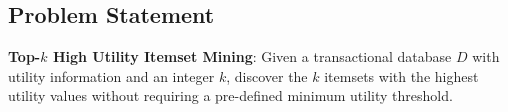 \subsection{Problem Statement}

\textbf{Top-$k$ High Utility Itemset Mining}: Given a transactional database $D$ with utility information and an integer $k$, discover the $k$ itemsets with the highest utility values without requiring a pre-defined minimum utility threshold.